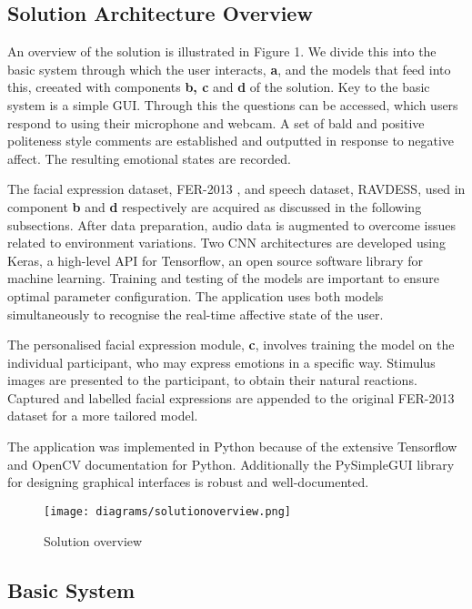 \documentclass[12pt,a4paper]{article}
\begin{document}
\subsection{Solution Architecture Overview}
An overview of the solution is illustrated in Figure 1. We divide this into the basic system through which the user interacts, \textbf{a}, and the models that feed into this, creeated with components \textbf{b, c} and \textbf{d} of the solution. Key to the basic system is a simple GUI. Through this the questions can be accessed, which users respond to using their microphone and webcam. A set of bald and positive politeness style comments are established and outputted in response to negative affect. The resulting emotional states are recorded.

The facial expression dataset, FER-2013 \cite{Goodfeli-et-al-2013}, and speech dataset, RAVDESS, \cite{livingstone2018ryerson} used in component \textbf{b} and \textbf{d} respectively are acquired as discussed in the following subsections. After data preparation, audio data is augmented to overcome issues related to environment variations. Two CNN architectures are developed using Keras, a high-level API for Tensorflow, an open source software library for machine learning. Training and testing of the models are important to ensure optimal parameter configuration. The application uses both models simultaneously to recognise the real-time affective state of the user. 

 The personalised facial expression module, \textbf{c}, involves training the model on the individual participant, who may express emotions in a specific way. Stimulus images are presented to the participant, to obtain their natural reactions. Captured and labelled facial expressions are appended to the original FER-2013 dataset for a more tailored model.

The application was implemented in Python because of the extensive Tensorflow and OpenCV documentation for Python. Additionally the PySimpleGUI library for designing graphical interfaces is robust and well-documented.

\begin{figure}[h]
	\centerline{\texttt{[image: diagrams/solutionoverview.png]}}
	\caption{Solution overview}
\end{figure}

\subsection{Basic System}
\end{document}
